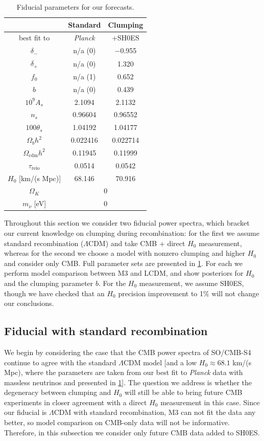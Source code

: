 \begin{table}[ht!]
\centering
\begin{tabular}{|c|c|c|}
\hline
 & Standard & Clumping \\
\hline
best fit to & {\it Planck} & +SH0ES \\
\hline
$\delta_-$ & n/a (0) & $-$0.955 \\
$\delta_+$ & n/a (0) & 1.320 \\
$f_0$ & n/a (1) & 0.652 \\
\hline
$b$ & n/a (0) & 0.439 \\
\hline
$10^9 A_s$ & 2.1094 & 2.1132 \\
$n_s$ & 0.96604 & 0.96552 \\
$100\theta_s$ & 1.04192 & 1.04177 \\
$\Omega_b h^2$ & 0.022416 & 0.022714 \\
$\Omega_\mathrm{cdm} h^2$ & 0.11945 & 0.11999 \\
$\tau_\mathrm{reio}$ & 0.0514 & 0.0542 \\
\hline
$H_0$ [km/(s Mpc)] & 68.146 & 70.916 \\
\hline
$\Omega_K$ & \multicolumn{2}{c|}{0} \\
$m_\nu$ [eV] & \multicolumn{2}{c|}{0} \\
\hline
\end{tabular}
\caption{Fiducial parameters for our forecasts.}
\label{tab:fiducials}
\end{table}

Throughout this section we consider two fiducial power spectra, which bracket our current knowledge on clumping during recombination: for the first we assume standard recombination ($\Lambda$CDM) and take CMB + direct $H_0$ measurement, whereas for the second we choose a model with nonzero clumping and higher $H_0$ and consider only CMB.
Full parameter sets are presented in \cref{tab:fiducials}.
For each we perform model comparison between M3 and LCDM, and show posteriors for $H_0$ and the clumping parameter $b$.
For the $H_0$ measurement, we assume SH0ES, though we have checked that an $H_0$ precision improvement to 1\% will not change our conclusions.

\subsection{Fiducial with standard recombination}
\label{sec:forecasts-standard}

We begin by considering the case that the CMB power spectra of SO/CMB-S4 continue to agree with the standard $\Lambda$CDM model [and a low $H_0\approx 68.1$ km/(s Mpc), where the parameters are taken from our best fit to {\it Planck} data with massless neutrinos and presented in \cref{tab:fiducials}].
The question we address is whether the degeneracy between clumping and $H_0$ will still be able to bring future CMB experiments in closer agreement with a direct $H_0$ measurement in this case.
Since our fiducial is $\Lambda$CDM with standard recombination, M3 can not fit the data any better, so model comparison on CMB-only data will not be informative.
Therefore, in this subsection we consider only future CMB data added to SH0ES.

